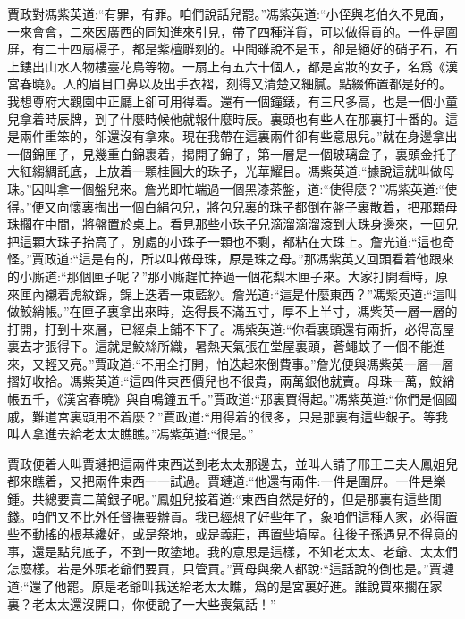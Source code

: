 \begin{parag}
    賈政對馮紫英道:“有罪，有罪。咱們說話兒罷。”馮紫英道:“小侄與老伯久不見面，一來會會，二來因廣西的同知進來引見，帶了四種洋貨，可以做得貢的。一件是圍屏，有二十四扇槅子，都是紫檀雕刻的。中間雖說不是玉，卻是絕好的硝子石，石上鏤出山水人物樓臺花鳥等物。一扇上有五六十個人，都是宮妝的女子，名爲《漢宮春曉》。人的眉目口鼻以及出手衣褶，刻得又清楚又細膩。點綴佈置都是好的。我想尊府大觀園中正廳上卻可用得着。還有一個鐘錶，有三尺多高，也是一個小童兒拿着時辰牌，到了什麼時候他就報什麼時辰。裏頭也有些人在那裏打十番的。這是兩件重笨的，卻還沒有拿來。現在我帶在這裏兩件卻有些意思兒。”就在身邊拿出一個錦匣子，見幾重白錦裹着，揭開了錦子，第一層是一個玻璃盒子，裏頭金托子大紅縐綢託底，上放着一顆桂圓大的珠子，光華耀目。馮紫英道:“據說這就叫做母珠。”因叫拿一個盤兒來。詹光即忙端過一個黑漆茶盤，道:“使得麼？”馮紫英道:“使得。”便又向懷裏掏出一個白絹包兒，將包兒裏的珠子都倒在盤子裏散着，把那顆母珠擱在中間，將盤置於桌上。看見那些小珠子兒滴溜滴溜滾到大珠身邊來，一回兒把這顆大珠子抬高了，別處的小珠子一顆也不剩，都粘在大珠上。詹光道:“這也奇怪。”賈政道:“這是有的，所以叫做母珠，原是珠之母。”那馮紫英又回頭看着他跟來的小廝道:“那個匣子呢？”那小廝趕忙捧過一個花梨木匣子來。大家打開看時，原來匣內襯着虎紋錦，錦上迭着一束藍紗。詹光道:“這是什麼東西？”馮紫英道:“這叫做鮫綃帳。”在匣子裏拿出來時，迭得長不滿五寸，厚不上半寸，馮紫英一層一層的打開，打到十來層，已經桌上鋪不下了。馮紫英道:“你看裏頭還有兩折，必得高屋裏去才張得下。這就是鮫絲所織，暑熱天氣張在堂屋裏頭，蒼蠅蚊子一個不能進來，又輕又亮。”賈政道:“不用全打開，怕迭起來倒費事。”詹光便與馮紫英一層一層摺好收拾。馮紫英道:“這四件東西價兒也不很貴，兩萬銀他就賣。母珠一萬，鮫綃帳五千，《漢宮春曉》與自鳴鐘五千。”賈政道:“那裏買得起。”馮紫英道:“你們是個國戚，難道宮裏頭用不着麼？”賈政道:“用得着的很多，只是那裏有這些銀子。等我叫人拿進去給老太太瞧瞧。”馮紫英道:“很是。”
\end{parag}


\begin{parag}
    賈政便着人叫賈璉把這兩件東西送到老太太那邊去，並叫人請了邢王二夫人鳳姐兒都來瞧着，又把兩件東西一一試過。賈璉道:“他還有兩件:一件是圍屏。一件是樂鍾。共總要賣二萬銀子呢。”鳳姐兒接着道:“東西自然是好的，但是那裏有這些閒錢。咱們又不比外任督撫要辦貢。我已經想了好些年了，象咱們這種人家，必得置些不動搖的根基纔好，或是祭地，或是義莊，再置些墳屋。往後子孫遇見不得意的事，還是點兒底子，不到一敗塗地。我的意思是這樣，不知老太太、老爺、太太們怎麼樣。若是外頭老爺們要買，只管買。”賈母與衆人都說:“這話說的倒也是。”賈璉道:“還了他罷。原是老爺叫我送給老太太瞧，爲的是宮裏好進。誰說買來擱在家裏？老太太還沒開口，你便說了一大些喪氣話！”
\end{parag}


